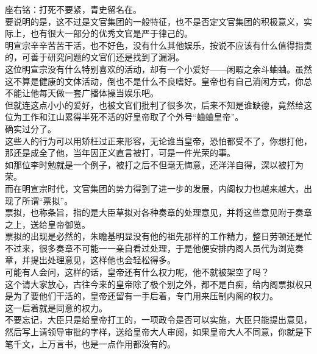 \begin{multicols}{\theparacolNo}
座右铭：打死不要紧，青史留名在。\\

要说明的是，这不过是文官集团的一般特征，也不是否定文官集团的积极意义，实际上，也有很大一部分的优秀文官是严于律己的。\\

明宣宗辛辛苦苦干活，也不好色，没有什么其他娱乐，按说不应该有什么值得指责的，可善于研究问题的文官们还是找到了漏洞。\\

这位明宣宗没有什么特别喜欢的活动，却有一个小爱好——闲暇之余斗蛐蛐。虽然这不算是健康的文体活动，倒也不是什么不良嗜好。皇帝也有自己消闲方式，你总不能让他每天做一套广播体操当娱乐吧。\\

但就连这点小小的爱好，也被文官们批判了很多次，后来不知是谁缺德，竟然给这位为工作和江山累得半死不活的好皇帝取了个外号“蛐蛐皇帝”。\\

确实过分了。\\

这些人的行为可以用矫枉过正来形容，无论谁当皇帝，恐怕都受不了，你想打他，那还是成全了他，当年因正义直言被打，可是一件光荣的事。\\

如那位李时勉就是一个例子，被打之后不但毫无悔意，还洋洋自得，深以被打为荣。\\

而在明宣宗时代，文官集团的势力得到了进一步的发展，内阁权力也越来越大，出现了所谓“票拟”。\\

票拟，也称条旨，指的是大臣草拟对各种奏章的处理意见，并将这些意见附于奏章之上，送给皇帝御览。\\

票拟的出现是必然的，朱瞻基明显没有他的祖先那样的工作精力，整日劳顿还是忙不过来，很多奏章不可能一一亲自看过处理，于是他便安排内阁人员代为浏览奏章，并提出处理意见，这样他也会轻松得多。\\

可能有人会问，这样的话，皇帝还有什么权力呢，他不就被架空了吗？\\

这个请大家放心，古往今来的皇帝除了极个别之外，都不是白痴，给内阁票拟权只是为了要他们干活的，皇帝还留有一手后着，专门用来压制内阁的权力。\\

这一后着就是同意的权力。\\

不要忘记，大臣只是给皇帝打工的，一项政令是否可以实施，大臣只能提出意见，然后写上请领导审批的字样，送给皇帝大人审阅，如果皇帝大人不同意，你就是下笔千文，上万言书，也是一点作用都没有的。\\


\end{multicols}

